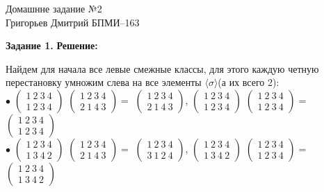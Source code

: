 \documentclass[12pt,a4paper]{scrartcl}
\begin{document}
	\begin{center}	
		Домашнне задание №2 \\
		Григорьев Дмитрий БПМИ--163
	\end{center}
	\textbf{Задание 1.}
	\newline
	\textbf{Решение:}
	\newline
	\indent
	
	Найдем для начала все левые смежные классы, для этого каждую четную перестановку умножим слева на все элементы $\langle\sigma\rangle$(а их всего 2):  \\
	$\bullet$
	$\begin{pmatrix}
		1~2~3~4\\
		1~2~3~4
	\end{pmatrix}$
	$\begin{pmatrix}
	1~2~3~4\\
	2~1~4~3
	\end{pmatrix} = $ $\begin{pmatrix}
	1~2~3~4\\
	2~1~4~3
	\end{pmatrix}$, $\begin{pmatrix}
	1~2~3~4\\
	1~2~3~4
	\end{pmatrix}$
	$\begin{pmatrix}
	1~2~3~4\\
	1~2~3~4
	\end{pmatrix} = $ $\begin{pmatrix}
	1~2~3~4\\
	1~2~3~4
	\end{pmatrix}$\\
	$\bullet$
	$\begin{pmatrix}
	1~2~3~4\\
	1~3~4~2
	\end{pmatrix}$
	$\begin{pmatrix}
	1~2~3~4\\
	2~1~4~3
	\end{pmatrix} = $ $\begin{pmatrix}
	1~2~3~4\\
	3~1~2~4
	\end{pmatrix}$, $\begin{pmatrix}
	1~2~3~4\\
	1~3~4~2
	\end{pmatrix}$
	$\begin{pmatrix}
	1~2~3~4\\
	1~2~3~4
	\end{pmatrix} = $ $\begin{pmatrix}
	1~2~3~4\\
	1~3~4~2
	\end{pmatrix}$\\
\end{document}
